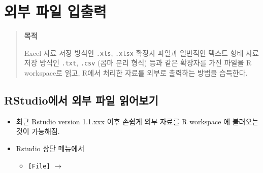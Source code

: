 \documentclass[11pt,a4paper]{book}
\providecommand{\tightlist}{%
  \setlength{\itemsep}{0pt}\setlength{\parskip}{0pt}}
\theoremstyle{definition}
\theoremstyle{definition}
\theoremstyle{definition}
\theoremstyle{remark}
\begin{document}
\section{외부 파일 입출력}\label{--}

\begin{quote}
\colorbox{gray!10}{\begin{minipage}{15cm}
\textbf{목적}

Excel 자료 저장 방식인 \texttt{.xls}, \texttt{.xlsx} 확장자 파일과 일반적인 텍스트 형태 자료 저장 방식인 \texttt{.txt}, \texttt{.csv} (콤마 분리 형식) 등과 같은 확장자를 가진 파일을 R workspace로 읽고, R에서 처리한 자료를 외부로 출력하는 방법을 습득한다. 

\end{minipage}}
\end{quote}

\subsection{RStudio에서 외부 파일 읽어보기}\label{rstudio---}

\begin{itemize}
\tightlist
\item
  최근 Rstudio version 1.1.xxx 이후 손쉽게 외부 자료를 R workspace 에
  불러오는 것이 가능해짐.
\item
  Rstudio 상단 메뉴에서

  \begin{itemize}
  \tightlist
  \item
    \texttt{{[}File{]}} \(\rightarrow\)
  \end{itemize}
\end{itemize}

\renewcommand\bibname{References}

\end{document}
